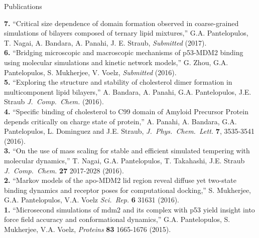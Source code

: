 \documentclass[a4paper]{article}
\def\jcc{\it J.~Comp.~Chem.}
\def\jpcl{\it J.~Phys.~Chem.~Lett.}
\def\prot{\it Proteins}
\def\jpcl{\it J.~Phys.~Chem.~Lett.}
\def\scirep{\it Sci.~Rep.}
\begin{document}
\begin{rubrique}{Publications}
\end{rubrique}

{\bf 7.} ``Critical size dependence of domain formation observed in coarse-grained simulations of bilayers composed of ternary lipid mixtures,'' G.A. Pantelopulos, T. Nagai, A. Bandara, A. Panahi, J. E. Straub, \textit{Submitted} (2017). \\
{\bf 6.} ``Bridging microscopic and macroscopic mechanisms of p53-MDM2 binding using molecular simulations and kinetic network models,'' G. Zhou, G.A. Pantelopulos, S. Mukherjee, V. Voelz, \textit{Submitted} (2016). \\
{\bf 5.} ``Exploring the structure and stability of cholesterol dimer formation in multicomponent lipid bilayers,'' A. Bandara, A. Panahi, G.A. Pantelopulos, J.E. Straub {\jcc} (2016). \\
{\bf 4.}  ``Specific binding of cholesterol to C99 domain of Amyloid Precursor Protein depends critically on charge state of protein,'' A. Panahi, A. Bandara, G.A. Pantelopulos, L. Dominguez and J.E. Straub, {\jpcl} {\bf 7}, 3535-3541 (2016). \\
{\bf 3.} ``On the use of mass scaling for stable and efficient simulated tempering with molecular dynamics,'' T. Nagai, G.A. Pantelopulos, T. Takahashi, J.E. Straub {\jcc} {\bf 27} 2017-2028 (2016). \\
{\bf 2.} ``Markov models of the apo-MDM2 lid region reveal diffuse yet two-state binding dynamics and receptor poses for computational docking,'' S. Mukherjee, G.A. Pantelopulos, V.A. Voelz {\scirep} {\bf 6} 31631 (2016). \\
{\bf 1.} ``Microsecond simulations of mdm2 and its complex with p53 yield insight into force field accuracy and conformational dynamics,'' G.A. Pantelopulos, S. Mukherjee, V.A. Voelz, {\prot} {\bf 83} 1665-1676 (2015).
\end{document}
